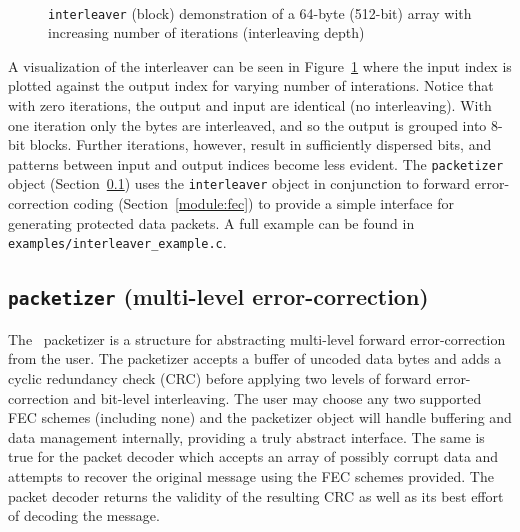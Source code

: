 \begin{figure}
\centering
\mbox{
   \quad
   \quad
}
\mbox{
   \quad
   \quad
}
\caption{{\tt interleaver} (block) demonstration of a 64-byte (512-bit) array
with increasing number of iterations (interleaving depth)}
\label{fig:module:framing:interleaver:scatterplot}
\end{figure}
%
A visualization of the interleaver can be seen in
Figure~\ref{fig:module:framing:interleaver:scatterplot}
where the input index is plotted against the output index for varying number
of interations.
Notice that with zero iterations, the output and input are identical (no
interleaving).
With one iteration only the bytes are interleaved, and so the output is
grouped into 8-bit blocks.
Further iterations, however, result in sufficiently dispersed bits, and
patterns between input and output indices become less evident.
%
The {\tt packetizer} object (Section~\ref{module:framing:packetizer}) uses the
{\tt interleaver} object in conjunction to forward error-correction coding
(Section~\ref{module:fec}) to provide a simple interface for generating
protected data packets.
A full example can be found in {\tt examples/interleaver\_example.c}.


%
%
\subsection{{\tt packetizer} (multi-level error-correction)}
\label{module:framing:packetizer}
The \liquid\ packetizer is a structure for abstracting multi-level forward
error-correction from the user.
The packetizer accepts a buffer of uncoded data bytes and adds a
cyclic redundancy check (CRC) before applying two levels of forward
error-correction and bit-level interleaving.
The user may choose any two supported FEC schemes (including none) and the
packetizer object will handle buffering and data management internally,
providing a truly abstract interface.
The same is true for the packet decoder which accepts an array
of possibly corrupt data and attempts to recover the original message using
the FEC schemes provided.
The packet decoder returns the validity of the resulting CRC as well as its
best effort of decoding the message.


